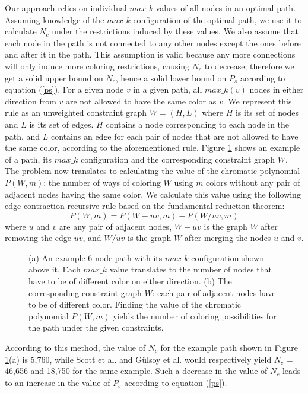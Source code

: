 \documentclass{ws-procs11x85}
\begin{document}
Our approach relies on individual $max\_k$ values of all nodes in an optimal
path. Assuming knowledge of the $max\_k$ configuration of the optimal path, we
use it to calculate $N_c$ under the restrictions induced by these values. We
also assume that each node in the path is not connected to any other nodes
except the ones before and after it in the path. This assumption is valid
because any more connections will only induce more coloring restrictions,
causing $N_c$ to decrease; therefore we get a solid upper bound on $N_c$, hence
a solid lower bound on $P_s$ according to equation (\ref{ps}). For a given node
$v$ in a given path, all $max\_k(v)$ nodes in either direction from $v$ are not allowed to have the same
color as $v$. We represent this rule as an unweighted constraint graph $W = (H,
L)$ where $H$ is its set of nodes and $L$ is its set of edges. $H$ contains a
node corresponding to each node in the path, and $L$ contains an edge for each
pair of nodes that are not allowed to have the same color, according to the
aforementioned rule. Figure \ref{maxk} shows an example of a path, its $max\_k$
configuration and the corresponding constraint graph $W$. The problem now
translates to calculating the value of the chromatic polynomial $P(W, m)$: the
number of ways of coloring $W$ using $m$ colors without any pair of adjacent
nodes having the same color. We calculate this value using the following
edge-contraction recursive rule based on the fundamental reduction
theorem\cite{dong}:
\begin{equation}
P(W, m) = P(W - uv, m) - P(W / uv, m)
\label{eqchromatic}
\end{equation}
where $u$ and $v$ are any pair of adjacent nodes, $W - uv$ is the graph $W$
after removing the edge $uv$, and $W / uv$ is the graph $W$ after merging the
nodes $u$ and $v$.

\begin{figure}[h]
\centerline{}
\caption{(a) An example 6-node path with its $max\_k$ configuration shown above
it. Each $max\_k$ value translates to the number of nodes that have to be of
different color on either direction. (b) The corresponding constraint graph $W$:
each pair of adjacent nodes have to be of different color. Finding the value of
the chromatic polynomial $P(W, m)$ yields the number of coloring possibilities
for the path under the given constraints.}
\label{maxk}
\end{figure}

According to this method, the value of $N_c$ for the example path shown in
Figure \ref{maxk}(a) is 5,760, while Scott et al.\cite{scott} and G{\"u}lsoy et
al.\cite{gulsoy} would respectively yield $N_c$ = 46,656 and 18,750 for the same
example. Such a decrease in the value of $N_c$ leads to an increase in the value
of $P_s$ according to equation (\ref{ps}).
\end{document}
